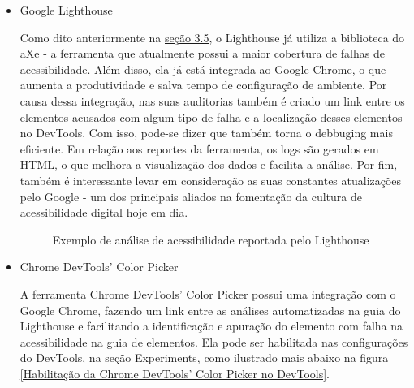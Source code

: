 \documentclass[
	12pt,				%
	openright,			%
	oneside,			%
	a4paper,			%
	chapter=TITLE,		%
	section=TITLE,		%
	subsection=TITLE,	%
	subsubsection=TITLE,%
	english,			%
	brazil				%
	]{abntex2}
\theoremstyle{definition}
\begin{document}
\begin{itemize}

    \item Google Lighthouse
    
Como dito anteriormente na \hyperref[sec:ferramentas]{seção 3.5}, o Lighthouse já utiliza a biblioteca do aXe - a ferramenta que atualmente possui a maior cobertura de falhas de acessibilidade. Além disso, ela já está integrada ao Google Chrome, o que aumenta a produtividade e salva tempo de configuração de ambiente. Por causa dessa integração, nas suas auditorias também é criado um link entre os elementos acusados com algum tipo de falha e a localização desses elementos no DevTools. Com isso, pode-se dizer que também torna o debbuging mais eficiente. Em relação aos reportes da ferramenta, os logs são gerados em HTML, o que melhora a visualização dos dados e facilita a análise. Por fim, também é interessante levar em consideração as suas constantes atualizações pelo Google - um dos principais aliados na fomentação da cultura de acessibilidade digital hoje em dia.


\begin{figure}[!h]
\centering
\caption{Exemplo de análise de acessibilidade reportada pelo Lighthouse}
\label{Exemplo de análise de acessibilidade reportada pelo Lighthouse}
\end{figure}

\pagebreak
    
    \item Chrome DevTools’ Color Picker
    
A ferramenta Chrome DevTools’ Color Picker possui uma integração com o Google Chrome, fazendo um link entre as análises automatizadas na guia do Lighthouse e facilitando a identificação e apuração do elemento com falha na acessibilidade na guia de elementos. Ela pode ser habilitada nas configurações do DevTools, na seção Experiments, como ilustrado mais abaixo na figura \ref{Habilitação da Chrome DevTools’ Color Picker no DevTools}.


\end{itemize}
\end{document}
